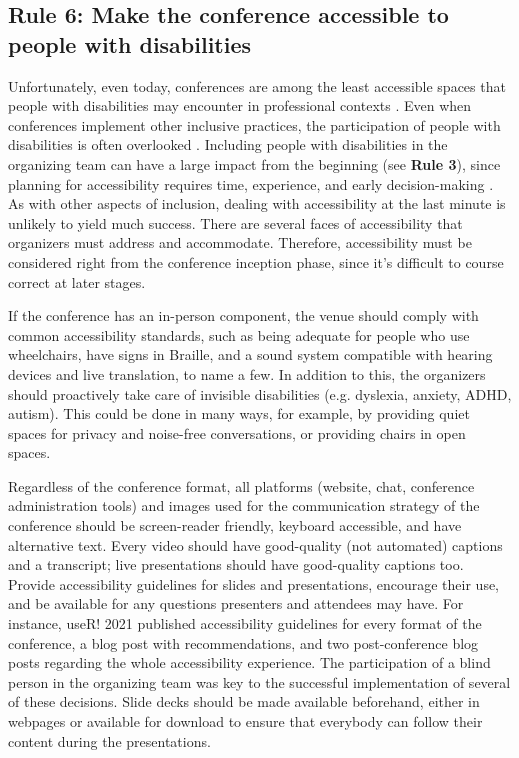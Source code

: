 \documentclass[10pt,letterpaper]{article}
\begin{document}
\subsection*{Rule 6: Make the conference accessible to people with disabilities}
\label{rule_accessibility}

Unfortunately, even today, conferences are among the least accessible spaces that people with disabilities may encounter in professional contexts \cite{priceAccessImaginedConstruction2009}. Even when conferences implement other inclusive practices, the participation of people with disabilities is often overlooked \cite{marks2021meeting}. Including people with disabilities in the organizing team can have a large impact from the beginning (see \textbf{Rule 3}), since planning for accessibility requires time, experience, and early decision-making \cite{irishIncreasingParticipationUsing2020}. As with other aspects of inclusion, dealing with accessibility at the last minute is unlikely to yield much success. There are several faces of accessibility that organizers must address and accommodate. Therefore, accessibility must be considered right from the conference inception phase, since it's difficult to course correct at later stages.

If the conference has an in-person component, the venue should comply with common accessibility standards, such as being adequate for people who use wheelchairs, have signs in Braille, and a sound system compatible with hearing devices and live translation, to name a few. In addition to this, the organizers should proactively take care of invisible disabilities (e.g. dyslexia, anxiety, ADHD, autism). This could be done in many ways, for example, by providing quiet spaces for privacy and noise-free conversations, or providing chairs in open spaces.

Regardless of the conference format, all platforms (website, chat, conference administration tools) and images used for the communication strategy of the conference should be screen-reader friendly, keyboard accessible, and have alternative text. Every video should have good-quality (not automated) captions and a transcript; live presentations should have good-quality captions too. 
Provide accessibility guidelines for slides and presentations, encourage their use, and be available for any questions presenters and attendees may have. For instance, useR! 2021 published accessibility guidelines for every format of the conference, a blog post with recommendations, and two post-conference blog posts regarding the whole accessibility experience. The participation of a blind person in the organizing team was key to the successful implementation of several of these decisions. 
Slide decks should be made available beforehand, either in webpages or available for download to ensure that everybody can follow their content during the presentations. 
\end{document}
